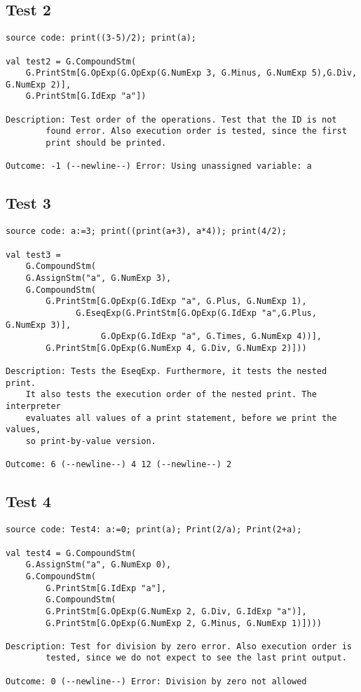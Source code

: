 \documentclass[a4paper]{article}
\begin{document}
\subsection{Test 2}
\begin{lstlisting}
source code: print((3-5)/2); print(a);

val test2 = G.CompoundStm(
	G.PrintStm[G.OpExp(G.OpExp(G.NumExp 3, G.Minus, G.NumExp 5),G.Div, G.NumExp 2)],
	G.PrintStm[G.IdExp "a"])

Description: Test order of the operations. Test that the ID is not
		found error. Also execution order is tested, since the first 
		print should be printed.

Outcome: -1 (--newline--) Error: Using unassigned variable: a
\end{lstlisting}

\subsection{Test 3}
\begin{lstlisting}
source code: a:=3; print((print(a+3), a*4)); print(4/2);

val test3 = 
    G.CompoundStm(
	G.AssignStm("a", G.NumExp 3),
	G.CompoundStm(
	    G.PrintStm[G.OpExp(G.IdExp "a", G.Plus, G.NumExp 1), 
		      G.EseqExp(G.PrintStm[G.OpExp(G.IdExp "a",G.Plus, G.NumExp 3)],
			       G.OpExp(G.IdExp "a", G.Times, G.NumExp 4))],
	    G.PrintStm[G.OpExp(G.NumExp 4, G.Div, G.NumExp 2)]))

Description: Tests the EseqExp. Furthermore, it tests the nested print.
	It also tests the execution order of the nested print. The interpreter
	evaluates all values of a print statement, before we print the values,
	so print-by-value version. 

Outcome: 6 (--newline--) 4 12 (--newline--) 2
\end{lstlisting}

\subsection{Test 4}
\begin{lstlisting}
source code: Test4: a:=0; print(a); Print(2/a); Print(2+a);

val test4 = G.CompoundStm(
	G.AssignStm("a", G.NumExp 0),
	G.CompoundStm(
	    G.PrintStm[G.IdExp "a"],
	    G.CompoundStm(
		G.PrintStm[G.OpExp(G.NumExp 2, G.Div, G.IdExp "a")],
		G.PrintStm[G.OpExp(G.NumExp 2, G.Minus, G.NumExp 1)])))

Description: Test for division by zero error. Also execution order is
		tested, since we do not expect to see the last print output.

Outcome: 0 (--newline--) Error: Division by zero not allowed
\end{lstlisting}
\end{document}
